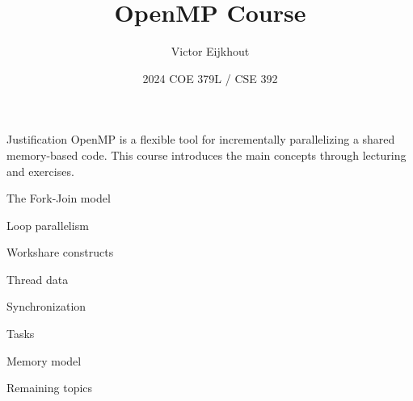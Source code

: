 \documentclass[10pt]{beamer}
\begin{document}


\author[Eijkhout]{Victor Eijkhout}
\date[2024]{2024 COE 379L / CSE 392}
\title[OMP]{OpenMP Course}
\maketitle

\begin{frame}{Justification}
  OpenMP is a flexible tool for incrementally parallelizing a shared
  memory-based code.
  This course introduces the main concepts
  through lecturing and exercises.
\end{frame}

 {The Fork-Join model}


 {Loop parallelism}


 {Workshare constructs}


 {Thread data}


 {Synchronization}


 {Tasks}


 {Memory model}


 {Remaining topics}

\end{document}
